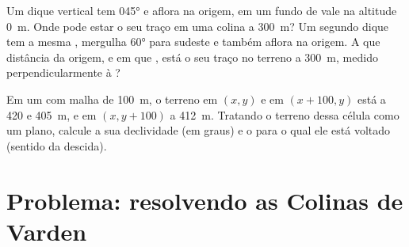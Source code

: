 \begin{exercise}[$\star\star\star$]\label{exo:b1:geological-maps:11}
Um dique vertical tem  \ang{045} e aflora na origem, em um fundo de vale na altitude \qty{0}{m}. Onde pode estar o seu traço em uma colina a \qty{300}{m}? Um segundo dique tem a mesma , mergulha \ang{60} para sudeste e também aflora na origem. A que distância da origem, e em que , está o seu traço no terreno a \qty{300}{m}, medido perpendicularmente à ?
\end{exercise}

\begin{exercise}[$\star\star\star$]\label{exo:b1:geological-maps:12}
Em um  com malha de \qty{100}{m}, o terreno em $(x, y)$ e em $(x + 100, y)$ está a 420 e \qty{405}{m}, e em $(x, y + 100)$ a \qty{412}{m}. Tratando o terreno dessa célula como um plano, calcule a sua declividade (em graus) e o  para o qual ele está voltado (sentido da descida).
\end{exercise}

\section{Problema: resolvendo as Colinas de Varden}

